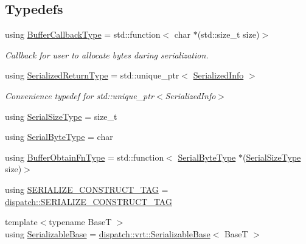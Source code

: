\subsection*{Typedefs}
\begin{DoxyCompactItemize}
\item 
using \hyperlink{namespacecheckpoint_a70bc1b37eae8e32129df38d981ef90f6}{Buffer\+Callback\+Type} = std\+::function$<$ char $\ast$(std\+::size\+\_\+t size)$>$
\begin{DoxyCompactList}\small\item\em Callback for user to allocate bytes during serialization. \end{DoxyCompactList}\item 
using \hyperlink{namespacecheckpoint_aa61e2b491f405a63a394f9aad528c37a}{Serialized\+Return\+Type} = std\+::unique\+\_\+ptr$<$ \hyperlink{structcheckpoint_1_1_serialized_info}{Serialized\+Info} $>$
\begin{DoxyCompactList}\small\item\em Convenience typedef for {\ttfamily std\+::unique\+\_\+ptr$<$\+Serialized\+Info$>$} \end{DoxyCompactList}\item 
using \hyperlink{namespacecheckpoint_a083f6674da3f94c2901b18c6d238217c}{Serial\+Size\+Type} = size\+\_\+t
\item 
using \hyperlink{namespacecheckpoint_ae57f01cdc0b81776c23b6c7c934c58f5}{Serial\+Byte\+Type} = char
\item 
using \hyperlink{namespacecheckpoint_a8a2558a1dd0db386339dd81c193b7f10}{Buffer\+Obtain\+Fn\+Type} = std\+::function$<$ \hyperlink{namespacecheckpoint_ae57f01cdc0b81776c23b6c7c934c58f5}{Serial\+Byte\+Type} $\ast$(\hyperlink{namespacecheckpoint_a083f6674da3f94c2901b18c6d238217c}{Serial\+Size\+Type} size)$>$
\item 
using \hyperlink{namespacecheckpoint_a7ff642cff4d72d01a16ab10e9bc363ef}{S\+E\+R\+I\+A\+L\+I\+Z\+E\+\_\+\+C\+O\+N\+S\+T\+R\+U\+C\+T\+\_\+\+T\+AG} = \hyperlink{structcheckpoint_1_1dispatch_1_1_s_e_r_i_a_l_i_z_e___c_o_n_s_t_r_u_c_t___t_a_g}{dispatch\+::\+S\+E\+R\+I\+A\+L\+I\+Z\+E\+\_\+\+C\+O\+N\+S\+T\+R\+U\+C\+T\+\_\+\+T\+AG}
\item 
{\footnotesize template$<$typename BaseT $>$ }\\using \hyperlink{namespacecheckpoint_ae8adefa66d7575697f8e465bed48e3cc}{Serializable\+Base} = \hyperlink{structcheckpoint_1_1dispatch_1_1vrt_1_1_serializable_base}{dispatch\+::vrt\+::\+Serializable\+Base}$<$ BaseT $>$
\item 

\end{DoxyCompactItemize}
